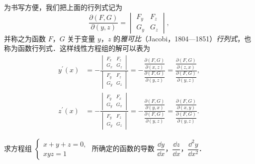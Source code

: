 为书写方便，我们把上面的行列式记为
\[
\frac{\partial(F,G)}{\partial(y,z)}=\begin{vmatrix}F_{y}&F_{z}\\ G_{y}&G_{z}\end{vmatrix},
\]
并称之为函数 $F$，$G$ 关于变量 $y$，$z$ 的\emph{雅可比}（Jacobi，1804---1851）\emph{行列式}，也称为函数行列式．这样线性方程组的解可以表为
\[
\begin{aligned}
y^{\prime}(x)&=-\frac{\begin{vmatrix}F_{x}&F_{z}\\ G_{x}&G_{z}\end{vmatrix}}{\begin{vmatrix}F_{y}&F_{z}\\ G_{y}&G_{z}\end{vmatrix}}=-\frac{\dfrac{\partial(F,G)}{\partial(x,z)}}{\dfrac{\partial(F,G)}{\partial(y,z)}}=\frac{\dfrac{\partial(F,G)}{\partial(z,x)}}{\dfrac{\partial(F,G)}{\partial(y,z)}},\\
z^{\prime}(x)&=-\frac{\begin{vmatrix}F_{y}&F_{x}\\ G_{y}&G_{x}\end{vmatrix}}{\begin{vmatrix}F_{y}&F_{z}\\ G_{y}&G_{z}\end{vmatrix}}=-\frac{\dfrac{\partial(F,G)}{\partial(y,x)}}{\dfrac{\partial(F,G)}{\partial(y,z)}}=\frac{\dfrac{\partial(F,G)}{\partial(x,y)}}{\dfrac{\partial(F,G)}{\partial(y,z)}}.
\end{aligned}
\tag{8}
\]

\begin{example}\label{ex:16-2-9}
求方程组 $\begin{cases}x+y+z=0,\\ xyz=1\end{cases}$ 所确定的函数的导数 $\dfrac{\dd y}{\dd x}$，$\dfrac{\dd z}{\dd x}$，$\dfrac{\dd^{2}y}{\dd x^{2}}$．
\end{example}


